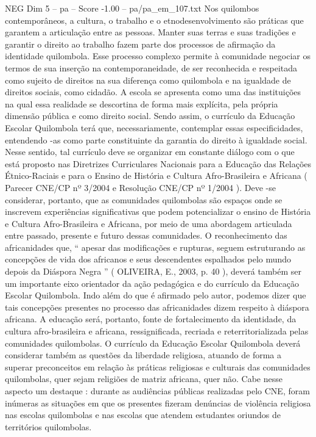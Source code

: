\begin{textsample}{NEG Dim 5 – pa – Score -1.00 – pa/pa\_em\_107.txt}  \label{ex:f5_neg_046}
Nos quilombos contemporâneos, a cultura, o trabalho e o etnodesenvolvimento são práticas que garantem a articulação entre as pessoas.
Manter suas terras e suas tradições e garantir o direito ao trabalho fazem parte dos processos de afirmação da identidade quilombola.
Esse processo complexo permite à comunidade negociar os termos de sua inserção na contemporaneidade, de ser reconhecida e respeitada como sujeito de direitos na sua diferença como quilombola e na igualdade de direitos sociais, como cidadão.
A escola se apresenta como uma das instituições na qual essa realidade se descortina de forma mais explícita, pela própria dimensão pública e como direito social.
Sendo assim, o currículo da Educação Escolar Quilombola terá que, necessariamente, contemplar essas especificidades, entendendo -as como parte constituinte da garantia do direito à igualdade social.
Nesse sentido, tal currículo deve se organizar em constante diálogo com o que está proposto nas Diretrizes Curriculares Nacionais para a Educação das Relações Étnico-Raciais e para o Ensino de História e Cultura Afro-Brasileira e Africana ( Parecer CNE/CP nº 3/2004 e Resolução CNE/CP nº 1/2004 ).
Deve -se considerar, portanto, que as comunidades quilombolas são espaços onde se inscrevem experiências significativas que podem potencializar o ensino de História e Cultura Afro-Brasileira e Africana, por meio de uma abordagem articulada entre passado, presente e futuro dessas comunidades.
O reconhecimento das africanidades que, “ apesar das modificações e rupturas, seguem estruturando as concepções de vida dos africanos e seus descendentes espalhados pelo mundo depois da Diáspora Negra ” ( OLIVEIRA, E., 2003, p. 40 ), deverá também ser um importante eixo orientador da ação pedagógica e do currículo da Educação Escolar Quilombola.
Indo além do que é afirmado pelo autor, podemos dizer que tais concepções presentes no processo das africanidades dizem respeito à diáspora africana.
A educação será, portanto, fonte de fortalecimento da identidade, da cultura afro-brasileira e africana, ressignificada, recriada e reterritorializada pelas comunidades quilombolas.
O currículo da Educação Escolar Quilombola deverá considerar também as questões da liberdade religiosa, atuando de forma a superar preconceitos em relação às práticas religiosas e culturais das comunidades quilombolas, quer sejam religiões de matriz africana, quer não.
Cabe nesse aspecto um destaque : durante as audiências públicas realizadas pelo CNE, foram inúmeras as situações em que os presentes fizeram denúncias de violência religiosa nas escolas quilombolas e nas escolas que atendem estudantes oriundos de territórios quilombolas.

\end{textsample}
